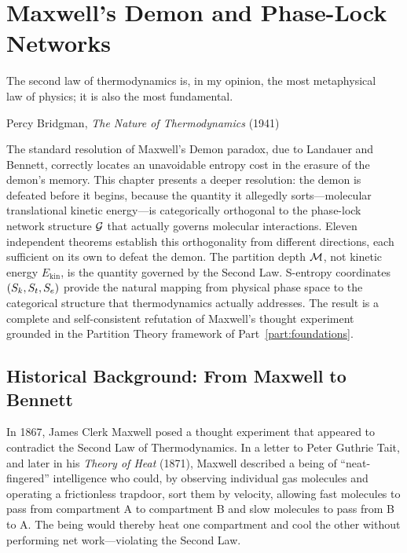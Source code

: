 
\chapter{Maxwell's Demon and Phase-Lock Networks}
\label{chap:maxwells_demon}

\epigraph{%
  The second law of thermodynamics is, in my opinion, the most metaphysical\\
  law of physics; it is also the most fundamental.%
}{Percy Bridgman, \textit{The Nature of Thermodynamics} (1941)}

\begin{chapterbox}
The standard resolution of Maxwell's Demon paradox, due to Landauer and Bennett,
correctly locates an unavoidable entropy cost in the erasure of the demon's
memory. This chapter presents a deeper resolution: the demon is defeated before
it begins, because the quantity it allegedly sorts---molecular translational
kinetic energy---is categorically orthogonal to the phase-lock network structure
$\mathcal{G}$ that actually governs molecular interactions. Eleven
independent theorems establish this orthogonality from different directions,
each sufficient on its own to defeat the demon. The partition depth $\mathcal{M}$,
not kinetic energy $E_{\mathrm{kin}}$, is the quantity governed by the Second
Law. S-entropy coordinates $(S_k, S_t, S_e)$ provide the natural mapping from
physical phase space to the categorical structure that thermodynamics actually
addresses. The result is a complete and self-consistent refutation of Maxwell's
thought experiment grounded in the Partition Theory framework of Part~\ref{part:foundations}.
\end{chapterbox}

\section{Historical Background: From Maxwell to Bennett}
\label{sec:demon_history}

In 1867, James Clerk Maxwell posed a thought experiment that appeared to
contradict the Second Law of Thermodynamics. In a letter to Peter Guthrie Tait,
and later in his \textit{Theory of Heat} (1871), Maxwell described a being of
``neat-fingered'' intelligence who could, by observing individual gas molecules
and operating a frictionless trapdoor, sort them by velocity, allowing fast
molecules to pass from compartment A to compartment B and slow molecules to
pass from B to A. The being would thereby heat one compartment and cool the
other without performing net work---violating the Second Law.

